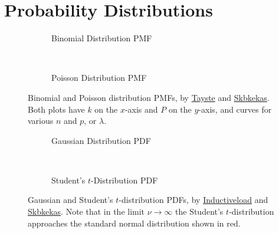 \chapter{Probability Distributions}
\label{dist}

\begin{figure}
  \centering

  \begin{subfigure}[b]{\wd\largestimage}\centering
  \caption{Binomial Distribution PMF}
  \label{fig:dist:binomial}
  \end{subfigure}
  ~
  \begin{subfigure}[b]{0.48\textwidth}\centering
    \usebox{\largestimage}
  \caption{Poisson Distribution PMF}
  \label{fig:dist:poisson}
  \end{subfigure}
\caption{
Binomial and Poisson distribution PMFs,
by \href{https://en.wikipedia.org/wiki/File:Binomial_distribution_pmf.svg}{Tayste}
and \href{https://en.wikipedia.org/wiki/File:Poisson_pmf.svg}{Skbkekas}.
Both plots have $k$ on the $x$-axis and $P$ on the $y$-axis, and curves for various $n$ and $p$, or $\lambda$.
\label{fig:dist:binomial_poisson}
}
\end{figure}

\begin{figure}
  \centering

  \begin{subfigure}[b]{0.48\textwidth}\centering
  \caption{Gaussian Distribution PDF}
  \label{fig:dist:gauss}
  \end{subfigure}
  ~
  \begin{subfigure}[b]{\wd\largestimage}\centering
    \usebox{\largestimage}
  \caption{Student's $t$-Distribution PDF}
  \label{fig:dist:student_t}
  \end{subfigure}
\caption{
Gaussian and Student's $t$-distribution PDFs,
by \href{https://en.wikipedia.org/wiki/File:Normal_Distribution_PDF.svg}{Inductiveload}
and \href{https://en.wikipedia.org/wiki/File:Student_t_pdf.svg}{Skbkekas}.
Note that in the limit $\nu \to \infty$ the Student's $t$-distribution
approaches the standard normal distribution shown in red.
\label{fig:dist:gauss_student_t}
}
\end{figure}



